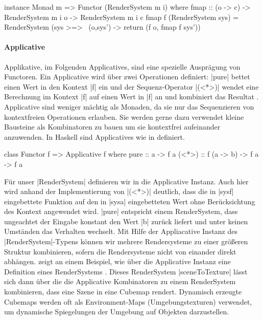 \begin{haskell}[label={lst:rendersystem-functor},caption={Functor Instanz für RenderSystem},float,floatplacement=H]
instance Monad m => Functor (RenderSystem m i) where
  fmap :: (o -> c) -> RenderSystem m i o -> RenderSystem m i c
  fmap f (RenderSystem sys) = RenderSystem (sys >=> \ (o,sys') -> return (f o, fmap f sys'))
\end{haskell}



\paragraph{Applicative}
Applikative, im Folgenden Applicatives, sind eine spezielle Ausprägung von Functoren. Ein Applicative wird über zwei Operationen definiert: |pure| bettet einen Wert in den Kontext |f| ein und der Sequenz-Operator |(<*>)| wendet eine Berechnung im Kontext |f| auf einen Wert in |f| an und kombiniert das Resultat \parencite[Kapitel~2]{Paterson2008}. Applicative sind weniger mächtig als Monaden, da sie nur das Sequenzieren von kontextfreien Operationen erlauben. Sie werden gerne dazu verwendet kleine Bausteine als Kombinatoren zu bauen um sie kontextfrei aufeinander anzuwenden. In Haskell sind Applicatives wie in  definiert.

\begin{haskell}[label={lst:class-functor},caption={Applicative Klasse\protect\footnotemark},nolol]
class Functor f => Applicative f where
  pure :: a -> f a
  (<*>) :: f (a -> b) -> f a -> f a
\end{haskell}

Für unser |RenderSystem| definieren wir in  die Applicative Instanz. Auch hier wird anhand der Implementierung von |(<*>)| deutlich, dass die in |sysf| eingebettete Funktion auf den in |sysa| eingebetteten Wert ohne Berücksichtung des Kontext angewendet wird. |pure| entspricht einem RenderSystem, dass ungeachtet der Eingabe konstant den Wert |b| zurück liefert und unter keinen Umständen das Verhalten wechselt. Mit Hilfe der Appliacative Instanz des |RenderSystem|-Typens können wir mehrere Rendersysteme zu einer größeren Struktur kombinieren, sofern die Rendersysteme nicht von einander direkt abhängen.  zeigt an einem Beispiel, wie über die Applicative Instanz eine Definition eines RenderSystems . Dieses RenderSystem |sceneToTexture| lässt sich dann über die die Applicative Kombinatoren zu einem RenderSystem kombinieren, dass eine Szene in eine Cubemap rendert. Dynamisch erzeugte Cubemaps werden oft als Environment-Maps (Umgebungstexturen) verwendet, um dynamische Spiegelungen der Umgebung auf Objekten darzustellen.

